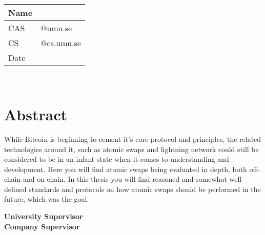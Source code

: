 \begin{titlepage}
	\thispagestyle{empty}
	\noindent {\large \MakeUppercase\university \\
				\instution \\
				\pagetypename \\
			  }

	\begin{center}
	\Large{\textbf{\titleFrontPage}}\\[7pt]

	\Large{\assignmentname}\\[40.0pt]
    
	\begin{tabular}{p{2cm}p{9.5cm}}
		\hline
		Name &  \hfill \name\\\hline
		CAS & \hfill \casuser @umu.se \\\hline
		CS & \hfill \csuser  @cs.umu.se \\\hline
		Date & \hfill \datemade\\ \hline
	\end{tabular}\\
	
	\vspace{10mm}
	\fontsize{10}{12}\selectfont
	\section*{Abstract}\vspace{-5mm}
	While Bitcoin is beginning to cement it's core protocol and principles, the related technologies around it, such as atomic swaps and lightning network could still be considered to be in an infant state when it comes to understanding and development. Here you will find atomic swaps being evaluated in depth, both off-chain and on-chain. In this thesis you will find reasoned and somewhat well defined standards and protocols on how atomic swaps should be performed in the future, which was the goal.
    \vfill
    
	\large{\textbf{University Supervisor\\}\usupervisor}
	\large{\textbf{Company Supervisor\\}\csupervisor}
	\end{center}
	\thispagestyle{empty}
\end{titlepage}
